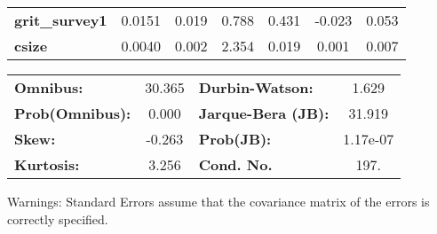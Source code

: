 \documentclass{report}
\begin{document}
\begin{center}
\begin{tabular}{lcccccc}
\textbf{grit\_survey1}   &       0.0151  &        0.019     &     0.788  &         0.431        &       -0.023    &        0.053     \\
\textbf{csize}           &       0.0040  &        0.002     &     2.354  &         0.019        &        0.001    &        0.007     \\
\bottomrule
\end{tabular}
\begin{tabular}{lclc}
\textbf{Omnibus:}       & 30.365 & \textbf{  Durbin-Watson:     } &    1.629  \\
\textbf{Prob(Omnibus):} &  0.000 & \textbf{  Jarque-Bera (JB):  } &   31.919  \\
\textbf{Skew:}          & -0.263 & \textbf{  Prob(JB):          } & 1.17e-07  \\
\textbf{Kurtosis:}      &  3.256 & \textbf{  Cond. No.          } &     197.  \\
\bottomrule
\end{tabular}
\end{center}

Warnings: \newline
 [1] Standard Errors assume that the covariance matrix of the errors is correctly specified.
\end{document}
